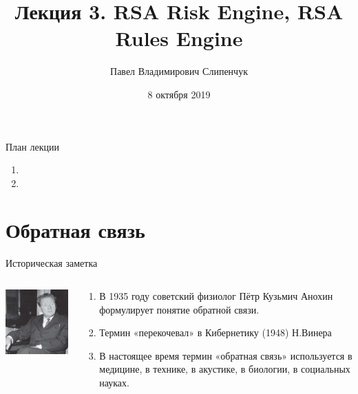 


\title{Лекция 3. RSA Risk Engine, RSA Rules Engine}
\date{8 октября 2019}
\author{Павел Владимирович Слипенчук}


  \maketitle
    
\begin{frame}{План лекции}
    \begin{enumerate}
		\item {}
		\item {}
	\end{enumerate}
\end{frame}

\section{Обратная связь}\label{section:feedback}

\begin{frame}{Историческая заметка}
	\begin{columns}
		\begin{column}{0.5\textwidth}
			\includegraphics[width=5cm]{../pic/anohin.jpg}
		\end{column}
		\begin{column}{0.6\textwidth}
			\begin{enumerate}
				\item В 1935 году советский физиолог
				Пётр Кузьмич Анохин формулирует понятие обратной связи.
				\item Термин «перекочевал» в Кибернетику (1948) Н.Винера
				\item В настоящее время термин «обратная связь» используется в медицине, в технике, в акустике, в биологии, в социальных науках.
			\end{enumerate}
		\end{column}
	\end{columns}
\end{frame}


